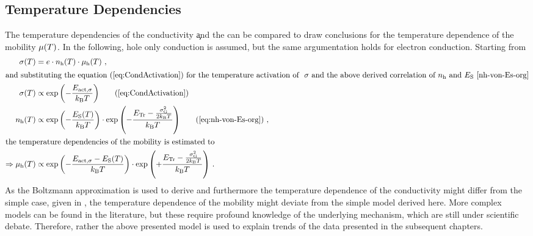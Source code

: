 \subsection{Temperature Dependencies}\label{sec:TheoTempDepMob}
The temperature dependencies of the conductivity \c and the \nLong \neh can be compared to draw conclusions for the temperature dependence of the mobility $\mob(\T)$. In the following, hole only conduction is assumed, but the same argumentation holds for electron conduction. Starting from 
\begin{align}
\c(T) &= e \cdot \nh(T) \cdot \mobh(T)
\nonumber
\KOMMA
\\
\intertext{and substituting the \eqnref{CondActivation} for the temperature activation of \c and the above derived correlation of \nh and \Es \eqref{nh-von-Es-org}}
\c(T) &\propto \exp{-\frac{\Eact}{\kT}}
\tag{\ref{eq:CondActivation}}
\\
\nh(T) &\propto
 \exp{-\frac{\Es(T)}{\kT}}
 \cdot
 \exp{-\frac{ \Et  - \frac{\gausswidth^2}{2\kT}}{\kT} }
\tag{\ref{eq:nh-von-Es-org}}
\KOMMA
\\
\intertext{the temperature dependencies of the mobility is estimated to}
\Rightarrow
\mobh(T) &\propto \exp{-\frac{\Eact-\Es(T)}{\kT}} \cdot \exp{+\frac{ \Et  - \frac{\gausswidth^2}{2\kT}}{\kT} }
\label{eq:mob-von-Eact-Es-org}
\PUNKT
\end{align}
As the Boltzmann approximation is used to derive  and furthermore the temperature dependence of the conductivity might differ from the simple case, given in , the temperature dependence of the mobility might deviate from the simple model derived here. More complex models can be found in the literature\cite{Bassler1982,Vissenberg1998}, but these require profound knowledge of the underlying mechanism, which are still under scientific debate.
Therefore, rather the above presented model is used to explain trends of the data presented in the subsequent chapters.

